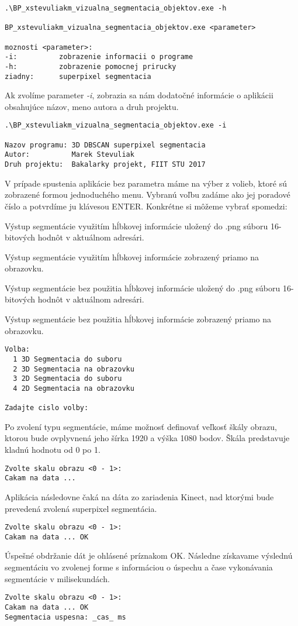 \begin{lstlisting}[style=DOS]
.\BP_xstevuliakm_vizualna_segmentacia_objektov.exe -h

BP_xstevuliakm_vizualna_segmentacia_objektov.exe <parameter>

moznosti <parameter>:
-i:          zobrazenie informacii o programe
-h:          zobrazenie pomocnej prirucky
ziadny:      superpixel segmentacia
\end{lstlisting}
Ak zvolíme parameter \textit{-i}, zobrazia sa nám dodatočné informácie o aplikácii obsahujúce názov, meno autora a druh projektu.
\begin{lstlisting}[style=DOS]
.\BP_xstevuliakm_vizualna_segmentacia_objektov.exe -i

Nazov programu: 3D DBSCAN superpixel segmentacia
Autor:          Marek Stevuliak
Druh projektu:  Bakalarky projekt, FIIT STU 2017
\end{lstlisting}
V prípade spustenia aplikácie bez parametra máme na výber z volieb, ktoré sú zobrazené formou jednoduchého menu. Vybranú voľbu zadáme ako jej poradové číslo a potvrdíme ju klávesou ENTER. Konkrétne si môžeme vybrať spomedzi:
\begin{my_enumerate}
	\item Výstup segmentácie využitím hĺbkovej informácie uložený do .png súboru 16-bitových hodnôt v aktuálnom adresári. 
	\item Výstup segmentácie využitím hĺbkovej informácie zobrazený priamo na obrazovku.
	\item Výstup segmentácie bez použitia hĺbkovej informácie uložený do .png súboru 16-bitových hodnôt v aktuálnom adresári. 
	\item Výstup segmentácie bez použitia hĺbkovej informácie zobrazený priamo na obrazovku.
\end{my_enumerate}
\newpage
\begin{lstlisting}[style=DOS]
Volba:
  1 3D Segmentacia do suboru
  2 3D Segmentacia na obrazovku
  3 2D Segmentacia do suboru
  4 2D Segmentacia na obrazovku

Zadajte cislo volby: 
\end{lstlisting}
Po zvolení typu segmentácie, máme možnosť definovať veľkosť škály obrazu, ktorou bude ovplyvnená jeho šírka 1920 a výška 1080 bodov. Škála predstavuje kladnú hodnotu od 0 po 1.
\begin{lstlisting}[style=DOS]
Zvolte skalu obrazu <0 - 1>:
Cakam na data ... 
\end{lstlisting}
Aplikácia následovne čaká na dáta zo zariadenia Kinect, nad ktorými bude prevedená zvolená superpixel segmentácia.
\begin{lstlisting}[style=DOS]
Zvolte skalu obrazu <0 - 1>:
Cakam na data ... OK
\end{lstlisting}
Úspešné obdržanie dát je ohlásené príznakom OK. Následne získavame výslednú segmentáciu vo zvolenej forme s informáciou o úspechu a čase vykonávania segmentácie v milisekundách.
\begin{lstlisting}[style=DOS]
Zvolte skalu obrazu <0 - 1>:
Cakam na data ... OK
Segmentacia uspesna: _cas_ ms
\end{lstlisting}


